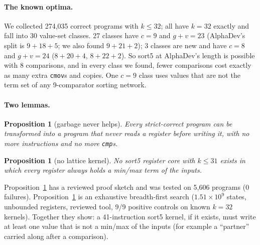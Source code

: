 \documentclass[11pt]{article}
\newtheorem{proposition}[theorem]{Proposition}
\theoremstyle{remark}\newtheorem{remark}[theorem]{Remark}
\begin{document}
\paragraph{The known optima.} We collected 274{,}035 correct programs with $k \le 32$; all have $k = 32$ exactly and fall into
30 value-set classes. 27 classes have $c = 9$ and $g + v = 23$ (AlphaDev's split is $9 + 18 + 5$; we also found $9 + 21 + 2$);
3 classes are new and have $c = 8$ and $g + v = 24$ ($8 + 20 + 4$, $8 + 22 + 2$). So sort5 at AlphaDev's length is possible
with 8 comparisons, and in every class we found, fewer comparisons cost exactly as many extra \texttt{cmov}s and copies.
One $c = 9$ class uses values that are not the term set of any 9-comparator sorting network.

\paragraph{Two lemmas.}
\begin{proposition}[garbage never helps]\label{prop:garbage}
Every strict-correct program can be transformed into a program that never reads a register before writing it, with no more
instructions and no more \texttt{cmp}s.
\end{proposition}
\begin{proposition}[no lattice kernel]\label{prop:lattice}
No sort5 register core with $k \le 31$ exists in which every register always holds a min/max term of the inputs.
\end{proposition}
Proposition~\ref{prop:garbage} has a reviewed proof sketch and was tested on 5{,}606 programs (0 failures).
Proposition~\ref{prop:lattice} is an exhaustive breadth-first search ($1.51\times10^9$ states, unbounded registers, reviewed
tool, 9/9 positive controls on known $k = 32$ kernels). Together they show: a 41-instruction sort5 kernel, if it exists, must
write at least one value that is not a min/max of the inputs (for example a ``partner'' carried along after a comparison).
\end{document}
